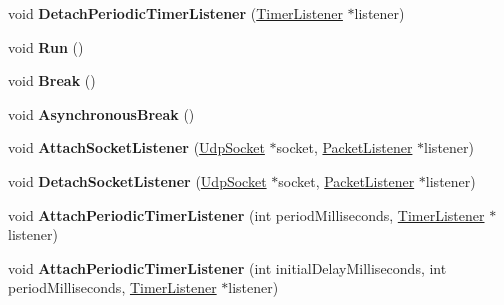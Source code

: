 \begin{DoxyCompactItemize}
void {\bfseries Detach\+Periodic\+Timer\+Listener} (\hyperlink{class_timer_listener}{Timer\+Listener} $\ast$listener)
\item 
\mbox{\label{class_socket_receive_multiplexer_1_1_implementation_a80492ed1e96059dd605e699989bffa1a}} 
void {\bfseries Run} ()
\item 
\mbox{\label{class_socket_receive_multiplexer_1_1_implementation_a4afe74ecc1e52d4ae8d30af6bb7c8d7f}} 
void {\bfseries Break} ()
\item 
\mbox{\label{class_socket_receive_multiplexer_1_1_implementation_a9fb12230b5f336d6a4720dac988b663d}} 
void {\bfseries Asynchronous\+Break} ()
\item 
\mbox{\label{class_socket_receive_multiplexer_1_1_implementation_a132a2e748001a9e2d555751181fe8782}} 
void {\bfseries Attach\+Socket\+Listener} (\hyperlink{class_udp_socket}{Udp\+Socket} $\ast$socket, \hyperlink{class_packet_listener}{Packet\+Listener} $\ast$listener)
\item 
\mbox{\label{class_socket_receive_multiplexer_1_1_implementation_a811808862a4766ba3bc5a5d46394bf4c}} 
void {\bfseries Detach\+Socket\+Listener} (\hyperlink{class_udp_socket}{Udp\+Socket} $\ast$socket, \hyperlink{class_packet_listener}{Packet\+Listener} $\ast$listener)
\item 
\mbox{\label{class_socket_receive_multiplexer_1_1_implementation_a71f803e1a50079c94552bc6f5d9278d5}} 
void {\bfseries Attach\+Periodic\+Timer\+Listener} (int period\+Milliseconds, \hyperlink{class_timer_listener}{Timer\+Listener} $\ast$listener)
\item 
\mbox{\label{class_socket_receive_multiplexer_1_1_implementation_a0b1dabf90c37f7b9e4c5aa88fd49f8eb}} 
void {\bfseries Attach\+Periodic\+Timer\+Listener} (int initial\+Delay\+Milliseconds, int period\+Milliseconds, \hyperlink{class_timer_listener}{Timer\+Listener} $\ast$listener)

\end{DoxyCompactItemize}
